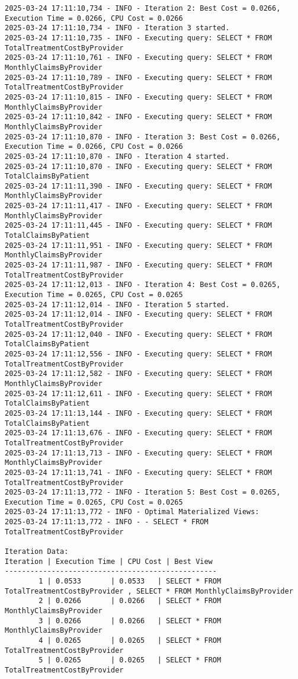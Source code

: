 \begin{lstlisting}[style=pythonstyle, caption={Output from python code }, label={lst:pso_query_optimization}]
2025-03-24 17:11:10,734 - INFO - Iteration 2: Best Cost = 0.0266, Execution Time = 0.0266, CPU Cost = 0.0266
2025-03-24 17:11:10,734 - INFO - Iteration 3 started.
2025-03-24 17:11:10,735 - INFO - Executing query: SELECT * FROM TotalTreatmentCostByProvider 
2025-03-24 17:11:10,761 - INFO - Executing query: SELECT * FROM MonthlyClaimsByProvider 
2025-03-24 17:11:10,789 - INFO - Executing query: SELECT * FROM TotalTreatmentCostByProvider 
2025-03-24 17:11:10,815 - INFO - Executing query: SELECT * FROM MonthlyClaimsByProvider 
2025-03-24 17:11:10,842 - INFO - Executing query: SELECT * FROM MonthlyClaimsByProvider 
2025-03-24 17:11:10,870 - INFO - Iteration 3: Best Cost = 0.0266, Execution Time = 0.0266, CPU Cost = 0.0266
2025-03-24 17:11:10,870 - INFO - Iteration 4 started.
2025-03-24 17:11:10,870 - INFO - Executing query: SELECT * FROM TotalClaimsByPatient 
2025-03-24 17:11:11,390 - INFO - Executing query: SELECT * FROM MonthlyClaimsByProvider 
2025-03-24 17:11:11,417 - INFO - Executing query: SELECT * FROM MonthlyClaimsByProvider 
2025-03-24 17:11:11,445 - INFO - Executing query: SELECT * FROM TotalClaimsByPatient 
2025-03-24 17:11:11,951 - INFO - Executing query: SELECT * FROM MonthlyClaimsByProvider 
2025-03-24 17:11:11,987 - INFO - Executing query: SELECT * FROM TotalTreatmentCostByProvider 
2025-03-24 17:11:12,013 - INFO - Iteration 4: Best Cost = 0.0265, Execution Time = 0.0265, CPU Cost = 0.0265
2025-03-24 17:11:12,014 - INFO - Iteration 5 started.
2025-03-24 17:11:12,014 - INFO - Executing query: SELECT * FROM TotalTreatmentCostByProvider 
2025-03-24 17:11:12,040 - INFO - Executing query: SELECT * FROM TotalClaimsByPatient 
2025-03-24 17:11:12,556 - INFO - Executing query: SELECT * FROM TotalTreatmentCostByProvider 
2025-03-24 17:11:12,582 - INFO - Executing query: SELECT * FROM MonthlyClaimsByProvider 
2025-03-24 17:11:12,611 - INFO - Executing query: SELECT * FROM TotalClaimsByPatient 
2025-03-24 17:11:13,144 - INFO - Executing query: SELECT * FROM TotalClaimsByPatient 
2025-03-24 17:11:13,676 - INFO - Executing query: SELECT * FROM TotalTreatmentCostByProvider 
2025-03-24 17:11:13,713 - INFO - Executing query: SELECT * FROM MonthlyClaimsByProvider 
2025-03-24 17:11:13,741 - INFO - Executing query: SELECT * FROM TotalTreatmentCostByProvider 
2025-03-24 17:11:13,772 - INFO - Iteration 5: Best Cost = 0.0265, Execution Time = 0.0265, CPU Cost = 0.0265
2025-03-24 17:11:13,772 - INFO - Optimal Materialized Views:
2025-03-24 17:11:13,772 - INFO - - SELECT * FROM TotalTreatmentCostByProvider 

Iteration Data:
Iteration | Execution Time | CPU Cost | Best View
--------------------------------------------------
        1 | 0.0533       | 0.0533   | SELECT * FROM TotalTreatmentCostByProvider , SELECT * FROM MonthlyClaimsByProvider 
        2 | 0.0266       | 0.0266   | SELECT * FROM MonthlyClaimsByProvider 
        3 | 0.0266       | 0.0266   | SELECT * FROM MonthlyClaimsByProvider 
        4 | 0.0265       | 0.0265   | SELECT * FROM TotalTreatmentCostByProvider 
        5 | 0.0265       | 0.0265   | SELECT * FROM TotalTreatmentCostByProvider 


\end{lstlisting}
